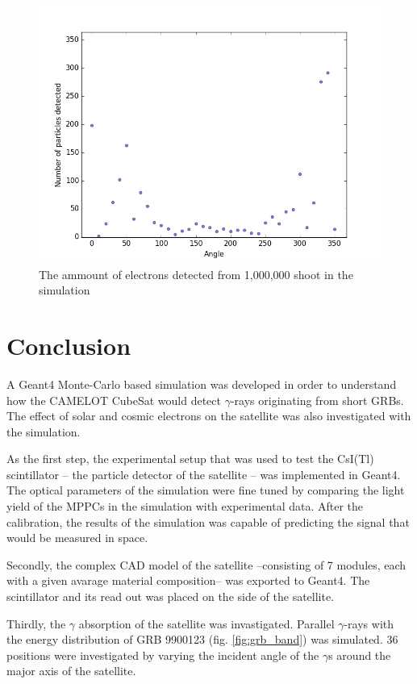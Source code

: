 \documentclass[12pt, a4paper,titlepage]{article}
\numberwithin{equation}{section}
\numberwithin{figure}{section}
\begin{document}
\begin{figure}[h!]
\includegraphics[width=150.0mm]{images/electronabsorption.png}
\caption{The ammount of electrons detected from 1,000,000 shoot in the simulation}
\end{figure}

\pagebreak

\section{Conclusion}

A Geant4 Monte-Carlo based simulation was developed in order to understand how the CAMELOT CubeSat would detect $\gamma$-rays originating from short GRBs. The effect of solar and cosmic electrons on the satellite was also investigated with the simulation.

As the first step, the experimental setup that was used to test the CsI(Tl) scintillator -- the particle detector of the satellite -- was implemented in Geant4. The optical parameters of the simulation were fine tuned by comparing the light yield of the MPPCs in the simulation with experimental data. After the calibration, the results of the simulation was capable of predicting the signal that would be measured in space.

Secondly, the complex CAD model of the satellite --consisting of 7 modules, each with a given avarage material composition-- was exported to Geant4. The scintillator and its read out was placed on the side of the satellite.

Thirdly, the $\gamma$ absorption of the satellite was invastigated. Parallel $\gamma$-rays with the energy distribution of GRB 9900123 (fig. \ref{fig:grb_band}) was simulated. 36 positions were investigated by varying the incident angle of the $\gamma$s around the major axis of the satellite.
\end{document}
